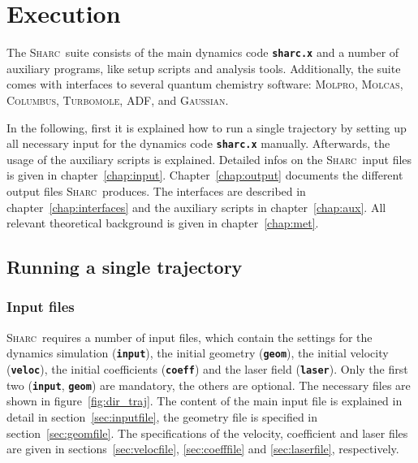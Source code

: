 \documentclass[a4paper,10pt,DIV=15,openany,twoside=false]{scrbook}
\newcommand{\sharc}{\textsc{Sharc}}
\newcommand{\ttt}[1]{\textbf{\texttt{#1}}}
\begin{document}
\chapter{Execution}

The \sharc\ suite consists of the main dynamics code \ttt{sharc.x} and a number of auxiliary programs, like setup scripts and analysis tools. Additionally, the suite comes with interfaces to several quantum chemistry software: \textsc{Molpro}, \textsc{Molcas}, \textsc{Columbus}, \textsc{Turbomole}, \textsc{ADF}, and \textsc{Gaussian}. 

In the following, first it is explained how to run a single trajectory by setting up all necessary input for the dynamics code \ttt{sharc.x} manually. Afterwards, the usage of the auxiliary scripts is explained. 
Detailed infos on the \sharc\ input files is given in chapter~\ref{chap:input}.
Chapter~\ref{chap:output} documents the different output files \sharc\ produces.
The interfaces are described in chapter~\ref{chap:interfaces} and the auxiliary scripts in chapter~\ref{chap:aux}. 
All relevant theoretical background is given in chapter~\ref{chap:met}.

\section{Running a single trajectory}

\subsection{Input files}

\sharc\ requires a number of input files, which contain the settings for the dynamics simulation (\ttt{input}), the initial geometry (\ttt{geom}), the initial velocity (\ttt{veloc}), the initial coefficients (\ttt{coeff}) and the laser field (\ttt{laser}). Only the first two (\ttt{input}, \ttt{geom}) are mandatory, the others are optional. The necessary files are shown in figure~\ref{fig:dir_traj}. 
The content of the main input file is explained in detail in section~\ref{sec:inputfile}, the geometry file is specified in section~\ref{sec:geomfile}. The specifications of the velocity, coefficient and laser files are given in sections~\ref{sec:velocfile}, \ref{sec:coefffile} and \ref{sec:laserfile}, respectively.
\end{document}
